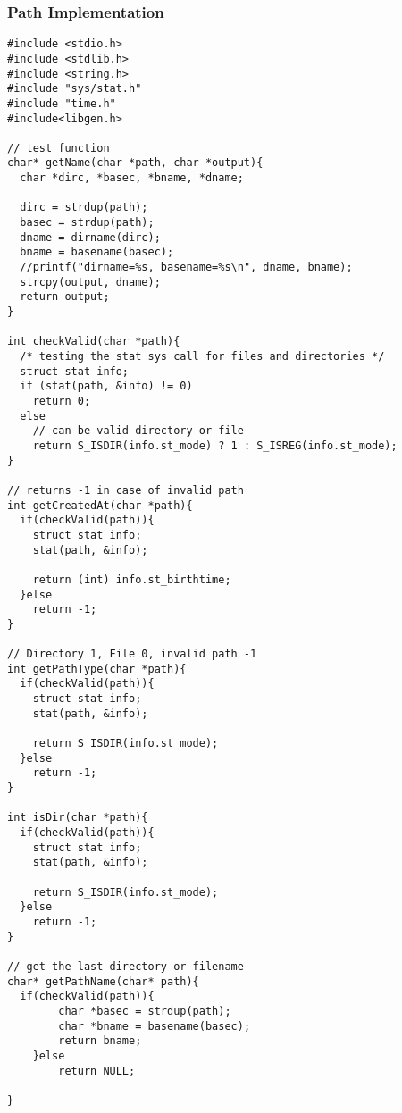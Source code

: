 \documentclass[11pt]{article}
\begin{document}
\newpage
\subsubsection{Path Implementation}
\begin{listing}[H]
  \begin{verbatim}
#include <stdio.h>
#include <stdlib.h>
#include <string.h>
#include "sys/stat.h"
#include "time.h"
#include<libgen.h>

// test function
char* getName(char *path, char *output){
  char *dirc, *basec, *bname, *dname;

  dirc = strdup(path);
  basec = strdup(path);
  dname = dirname(dirc);
  bname = basename(basec);
  //printf("dirname=%s, basename=%s\n", dname, bname);
  strcpy(output, dname);
  return output;
}

int checkValid(char *path){
  /* testing the stat sys call for files and directories */
  struct stat info;
  if (stat(path, &info) != 0)
    return 0;
  else
    // can be valid directory or file
    return S_ISDIR(info.st_mode) ? 1 : S_ISREG(info.st_mode);
}

// returns -1 in case of invalid path
int getCreatedAt(char *path){
  if(checkValid(path)){
    struct stat info;
    stat(path, &info);

    return (int) info.st_birthtime;
  }else
    return -1;
}

// Directory 1, File 0, invalid path -1
int getPathType(char *path){
  if(checkValid(path)){
    struct stat info;
    stat(path, &info);

    return S_ISDIR(info.st_mode);
  }else
    return -1;
}

int isDir(char *path){
  if(checkValid(path)){
    struct stat info;
    stat(path, &info);

    return S_ISDIR(info.st_mode);
  }else
    return -1;
}

// get the last directory or filename
char* getPathName(char* path){
  if(checkValid(path)){
        char *basec = strdup(path);
        char *bname = basename(basec);
        return bname;
    }else
        return NULL;

}
  \end{verbatim}
\end{listing}
\end{document}
